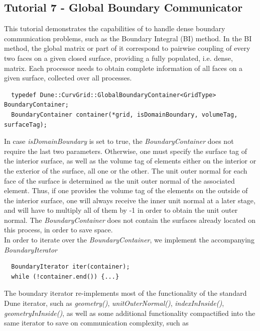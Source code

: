 \subsection{Tutorial 7 - Global Boundary Communicator}

\noindent
This tutorial demonstrates the capabilities of \curvgrid{} to handle dense boundary communication problems, such as the Boundary Integral (BI) method. In the BI method, the global matrix or part of it correspond to pairwise coupling of every two faces on a given closed surface, providing a fully populated, i.e. dense, matrix. Each processor needs to obtain complete information of all faces on a given surface, collected over all processes.

\begin{mybox}
\begin{lstlisting}
  typedef Dune::CurvGrid::GlobalBoundaryContainer<GridType> BoundaryContainer;
  BoundaryContainer container(*grid, isDomainBoundary, volumeTag, surfaceTag);
\end{lstlisting}
\end{mybox}

\noindent
In case \textit{isDomainBoundary} is set to true, the \textit{BoundaryContainer} does not require the last two parameters. Otherwise, one must specify the surface tag of the interior surface, as well as the volume tag of elements either on the interior or the exterior of the surface, all one or the other. The unit outer normal for each face of the surface is determined as the unit outer normal of the associated element. Thus, if one provides the volume tag of the elements on the outside of the interior surface, one will always receive the inner unit normal at a later stage, and will have to multiply all of them by -1 in order to obtain the unit outer normal. The \textit{BoundaryContainer} does not contain the surfaces already located on this process, in order to save space.  \\

\noindent
In order to iterate over the \textit{BoundaryContainer}, we implement the accompanying \textit{BoundaryIterator}

\begin{mybox}
\begin{lstlisting}
  BoundaryIterator iter(container);
  while (!container.end()) {...}
\end{lstlisting}
\end{mybox}

\noindent
The boundary iterator re-implements most of the functionality of the standard Dune iterator, such as \textit{geometry()}, \textit{unitOuterNormal()}, \textit{indexInInside()}, \textit{geometryInInside()}, as well as some additional functionality compactified into the same iterator to save on communication complexity, such as 


